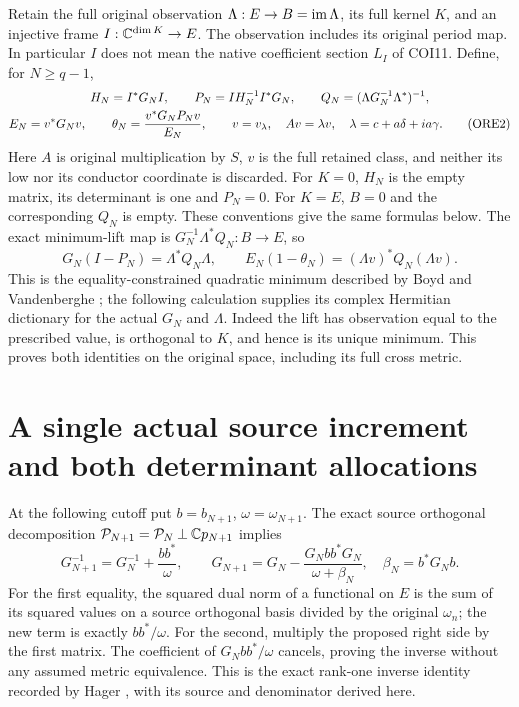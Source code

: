 Retain the full original observation $\Lambda:E\to B=\operatorname{im}\Lambda$,
its full kernel $K$, and an injective frame $I:\mathbb C^{\dim K}\to E$.
The observation includes its original period map. In particular $I$
does not mean the native coefficient section $L_I$ of COI11.
Define, for $N\ge q-1$,
\begin{gather}
 H_N=I^*G_NI,\qquad
 P_N=I H_N^{-1}I^*G_N,\qquad
 Q_N=(\Lambda G_N^{-1}\Lambda^*)^{-1},\notag\\
 E_N=v^*G_Nv,\qquad
 \theta_N=\frac{v^*G_NP_Nv}{E_N},\qquad
 v=v_\lambda,\quad Av=\lambda v,\quad
 \lambda=c+a\delta+ia\gamma.                         \tag{ORE2}
\end{gather}
Here $A$ is original multiplication by $S$, $v$ is the full retained
class, and neither its low nor its conductor coordinate is discarded.
For $K=0$, $H_N$ is the empty matrix, its determinant is one and
$P_N=0$. For $K=E$, $B=0$ and the corresponding $Q_N$ is empty.
These conventions give the same formulas below.
The exact minimum-lift map is
$G_N^{-1}\Lambda^*Q_N:B\to E$, so
\[
 G_N(I-P_N)=\Lambda^*Q_N\Lambda,
 \qquad E_N(1-\theta_N)=(\Lambda v)^*Q_N(\Lambda v).    \tag{ORE3}
\]
This is the equality-constrained quadratic minimum described by
Boyd and Vandenberghe \cite[Appendix C.4.1, p.~673]{a04ore:Boyd};
the following calculation supplies its complex Hermitian dictionary
for the actual $G_N$ and $\Lambda$.
Indeed the lift has observation equal to the prescribed value, is
orthogonal to $K$, and hence is its unique minimum. This proves both
identities on the original space, including its full cross metric.

\section{A single actual source increment and both determinant allocations}
At the following cutoff put $b=b_{N+1}$, $\omega=\omega_{N+1}$.
The exact source orthogonal decomposition
$\mathcal P_{N+1}=\mathcal P_N\mathbin{\perp}\mathbb C p_{N+1}$ implies
\begin{equation}\tag{ORE4}
 G_{N+1}^{-1}=G_N^{-1}+\frac{bb^*}{\omega},\qquad
 G_{N+1}=G_N-\frac{G_Nbb^*G_N}{\omega+\beta_N},
 \quad\beta_N=b^*G_Nb.
\end{equation}
For the first equality, the squared dual norm of a functional on $E$
is the sum of its squared values on a source orthogonal basis divided
by the original $\omega_n$; the new term is exactly $bb^*/\omega$.
For the second, multiply the proposed right side by the first matrix.
The coefficient of $G_Nbb^*/\omega$ cancels, proving the inverse
without any assumed metric equivalence. This is the exact rank-one
inverse identity recorded by Hager \cite[p.~221, equation (2)]{a04ore:Hager},
with its source and denominator derived here.

